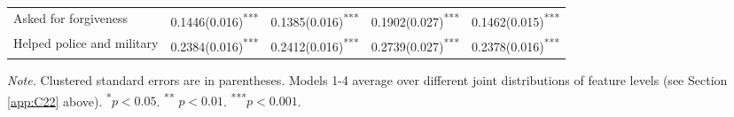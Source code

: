 \begin{table}[H]
\begin{threeparttable}
\begin{tabular}{lllll}
Asked for forgiveness &  0.1446(0.016)\textsuperscript{***}                   & 0.1385(0.016)\textsuperscript{***}   & 0.1902(0.027)\textsuperscript{***} & 0.1462(0.015)\textsuperscript{***}\\ 
Helped police and military &  0.2384(0.016)\textsuperscript{***}                  & 0.2412(0.016)\textsuperscript{***}   & 0.2739(0.027)\textsuperscript{***} & 0.2378(0.016)\textsuperscript{***}\\ 
\midrule
\bottomrule
\end{tabular}
\begin{tablenotes}
\footnotesize
\item[]\textit{Note.} Clustered standard errors are in parentheses. Models 1-4 average over different joint distributions of feature levels (see Section \ref{app:C22} above). \textsuperscript{*}$p < 0.05$. \textsuperscript{**} $p < 0.01$. \textsuperscript{***}$p < 0.001$.
\end{tablenotes}
\end{threeparttable}
\end{table}

